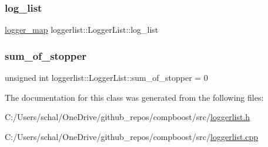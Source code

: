 \subsubsection{\texorpdfstring{log\+\_\+list}{log\_list}}
{\footnotesize\ttfamily \mbox{\hyperlink{loggerlist_8h_afa233b5ec9ffbe76605d913e86d40fe6}{logger\+\_\+map}} loggerlist\+::\+Logger\+List\+::log\+\_\+list\hspace{0.3cm}{\ttfamily [private]}}

\mbox{\label{classloggerlist_1_1_logger_list_a39c3b4cf8f01c0e29606a9b2537da347}} 
\subsubsection{\texorpdfstring{sum\+\_\+of\+\_\+stopper}{sum\_of\_stopper}}
{\footnotesize\ttfamily unsigned int loggerlist\+::\+Logger\+List\+::sum\+\_\+of\+\_\+stopper = 0\hspace{0.3cm}{\ttfamily [private]}}



The documentation for this class was generated from the following files\+:\begin{DoxyCompactItemize}
\item 
C\+:/\+Users/schal/\+One\+Drive/github\+\_\+repos/compboost/src/\mbox{\hyperlink{loggerlist_8h}{loggerlist.\+h}}\item 
C\+:/\+Users/schal/\+One\+Drive/github\+\_\+repos/compboost/src/\mbox{\hyperlink{loggerlist_8cpp}{loggerlist.\+cpp}}\end{DoxyCompactItemize}
